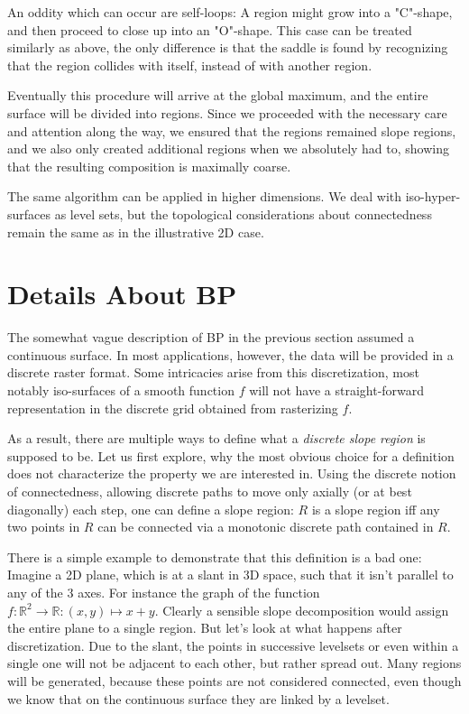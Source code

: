 \documentclass[a4paper,12pt,notitlepage,fullpage]{paper}
\theoremstyle{plain}
\theoremstyle{definition}
\begin{document}
An oddity which can occur are self-loops: A region might grow into a "C"-shape, and then proceed to close up into an "O"-shape. This case can be treated similarly as above, the only difference is that the saddle is found by recognizing that the region collides with itself, instead of with another region.

Eventually this procedure will arrive at the global maximum, and the entire surface will be divided into regions. Since we proceeded with the necessary care and attention along the way, we ensured that the regions remained slope regions, and we also only created additional regions when we absolutely had to, showing that the resulting composition is maximally coarse.

The same algorithm can be applied in higher dimensions. We deal with iso-hyper-surfaces as level sets, but the topological considerations about connectedness remain the same as in the illustrative 2D case.

\section{Details About BP}
The somewhat vague description of BP in the previous section assumed a continuous surface. In most applications, however, the data will be provided in a discrete raster format. Some intricacies arise from this discretization, most notably iso-surfaces of a smooth function $f$ will not have a straight-forward representation in the discrete grid obtained from rasterizing $f$.

As a result, there are multiple ways to define what a \emph{discrete slope region} is supposed to be.
Let us first explore, why the most obvious choice for a definition does not characterize the property we are interested in.
Using the discrete notion of connectedness, allowing discrete paths to move only axially (or at best diagonally) each step, one can define a slope region:
$R$ is a slope region iff any two points in $R$ can be connected via a monotonic discrete path contained in $R$.

There is a simple example to demonstrate that this definition is a bad one: Imagine a 2D plane, which is at a slant in 3D space, such that it isn't parallel to any of the 3 axes. For instance the graph of the function $f: \mathbb{R}^2 \rightarrow \mathbb{R}: (x,y)\mapsto x+y$. Clearly a sensible slope decomposition would assign the entire plane to a single region.
But let's look at what happens after discretization.
Due to the slant, the points in successive levelsets or even within a single one will not be adjacent to each other, but rather spread out.
Many regions will be generated, because these points are not considered connected, even though we know that on the continuous surface they are linked by a levelset.
\end{document}
